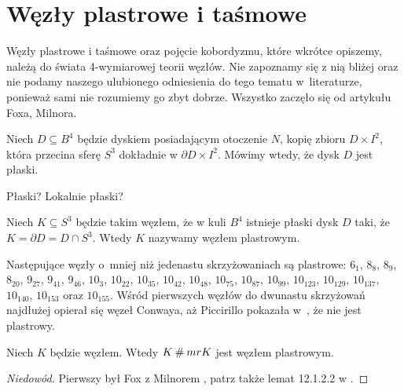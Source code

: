 \section{Węzły plastrowe i taśmowe} %
\label{sec:slice}
Węzły plastrowe i taśmowe oraz pojęcie kobordyzmu, które wkrótce opiszemy, należą do świata 4-wymiarowej teorii węzłów.
Nie zapoznamy się z nią bliżej oraz nie podamy naszego ulubionego odniesienia do tego tematu w~literaturze, ponieważ sami nie rozumiemy go zbyt dobrze.
Wszystko zaczęło się od artykułu \cite{fox66} Foxa, Milnora.


\begin{definition}
    Niech $D \subseteq B^4$ będzie dyskiem posiadającym otoczenie $N$, kopię zbioru $D \times I
    ^2$, która przecina sferę $S^3$ dokładnie w $\partial D \times I^2$.
    Mówimy wtedy, że dysk $D$ jest płaski.
\end{definition}

\begin{tobedone}
    Płaski? Lokalnie płaski?
    \cite[s. 155]{kawauchi96}
\end{tobedone}

\begin{definition}
    Niech $K \subseteq S^3$ będzie takim węzłem, że w kuli $B^4$ istnieje płaski dysk $D$ taki, że $K = \partial D = D \cap S^3$.
    Wtedy $K$ nazywamy węzłem plastrowym.
\end{definition}

Następujące węzły o~mniej niż jedenastu skrzyżowaniach są plastrowe: $6_1$, $8_{8}$, $8_{9}$, $8_{20}$, $9_{27}$, $9_{41}$, $9_{46}$, $10_{3}$, $10_{22}$, $10_{35}$, $10_{42}$, $10_{48}$, $10_{75}$, $10_{87}$, $10_{99}$, $10_{123}$, $10_{129}$, $10_{137}$, $10_{140}$, $10_{153}$ oraz $10_{155}$.
Wśród pierwszych węzłów do dwunastu skrzyżowań najdłużej opierał się węzeł Conwaya, aż Piccirillo pokazała w~\cite{piccirillo20}, że nie jest plastrowy.

\begin{proposition}
    Niech $K$ będzie węzłem.
    Wtedy $K \mathbin{\#} mr K$ jest węzłem plastrowym.
\end{proposition}

\begin{proof}[Niedowód]
    Pierwszy był Fox z Milnorem \cite{fox66}, patrz także lemat 12.1.2.2 w \cite{kawauchi96}.
\end{proof}

